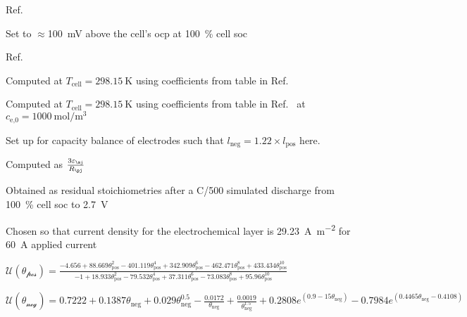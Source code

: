 \begin{table}[!htbp]
\begin{threeparttable}
        \begin{tablenotes}
        \item[a] Ref.~\cite{Northrop2011}
        \item[b] Set to $\approx $\SI{100}{\milli\volt} above the cell's \gls{ocp} at \SI{100}{\percent} cell \gls{soc}
        \item[c] Ref.~\cite{Subramanian2009}
        \item[d] Computed at $T_\text{cell} = \SI{298.15}{\kelvin}$ using coefficients from table  in Ref.~\cite{Valoen2005}\\%
        \item[e] Computed at $T_\text{cell} = \SI{298.15}{\kelvin}$ using coefficients from table  in Ref.~\cite{Valoen2005} at $c_\text{e,0}= \SI{1000}{\mole\per\meter\cubed}$\\
        \item[f] Set up for capacity balance of electrodes such that $l_\text{neg} = 1.22 \times l_\text{pos}$ here.
        \item[g] Computed as $\frac{3 \varepsilon_\sj}{R_\pj}$\\
        \item[h] Obtained as residual stoichiometries after a C/\num{500} simulated discharge from \SI{100}{\percent} cell \gls{soc} to \SI{2.7}{V}
        \item[i] Chosen so that current density for the electrochemical layer is \SI{29.23}{\ampere\per\meter\squared} for \SI{60}{\ampere} applied current
        \item[k] $ \mathcal{U(\theta_\text{pos})} = \displaystyle \frac{-4.656 + 88.669\theta_\text{pos}^2 - 401.119\theta_\text{pos}^4 + 342.909\theta_\text{pos}^6 - 462.471\theta_\text{pos}^8 + 433.434\theta_\text{pos}^{10}}{-1 + 18.933\theta_\text{pos}^2 - 79.532\theta_\text{pos}^4 + 37.311\theta_\text{pos}^6 - 73.083\theta_\text{pos}^8 + 95.96\theta_\text{pos}^{10}}$ \\[0.25em]
        \item[m] $\mathcal{U(\theta_\text{neg})} = 0.7222 + 0.1387\theta_\text{neg} + 0.029\theta_\text{neg}^{0.5} - \frac{0.0172}{\theta_\text{neg}} + \frac{0.0019}{\theta_\text{neg}^{1.5}} + 0.2808 e^{(0.9 - 15\theta_\text{neg})} - 0.7984 e^{(0.4465\theta_\text{neg} - 0.4108)}$\vfill
        \end{tablenotes}

    \end{threeparttable}
\end{table}


